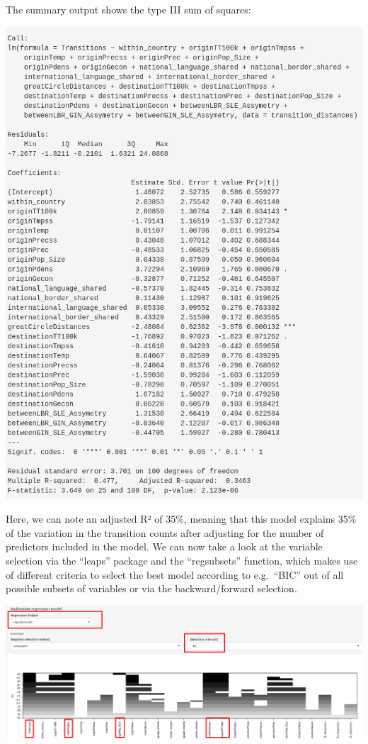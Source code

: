 \documentclass[
]{article}
\begin{document}
The summary output shows the type III sum of squares:

\includegraphics{tutorial_img/summary_multi.png}

Here, we can note an adjusted R² of 35\%, meaning that this model
explains 35\% of the variation in the transition counts after adjusting
for the number of predictors included in the model. We can now take a
look at the variable selection via the ``leaps'' package and the
``regsubsets'' function, which makes use of different criteria to select
the best model according to e.g.~``BIC'' out of all possible subsets of
variables or via the backward/forward selection.

\includegraphics{tutorial_img/regsubsets.ong.png}
\end{document}
